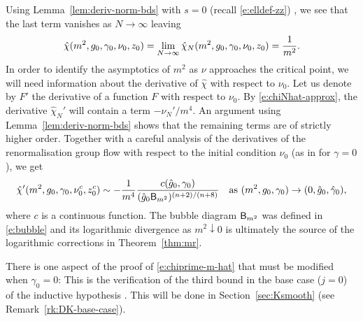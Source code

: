 Using Lemma~\ref{lem:deriv-norm-bds} with $s = 0$ (recall \eqref{e:elldef-zz})
,
we see that the last term vanishes as $N\to\infty$ leaving
\begin{equation}
\label{e:chi-m-hat}
\hat\chi(m^2, g_0, \gamma_0, \nu_0, z_0)
	=
\lim_{N\rightarrow\infty} \hat\chi_N(m^2, g_0, \gamma_0, \nu_0, z_0)
	=
\frac{1}{m^2}.
\end{equation}
In order to identify the asymptotics of $m^2$ as $\nu$ approaches the
critical point, we will need information about the derivative of $\hat\chi$ with
respect to $\nu_0$. Let us denote by $F'$ the derivative of a function $F$ with
respect to $\nu_0$. By \eqref{e:chiNhat-approx}, the derivative $\hat\chi_N'$
will contain a term $-\nu_N'/m^4$. An argument using Lemma~\ref{lem:deriv-norm-bds}
shows that the remaining terms are of strictly higher order. Together with a careful
analysis of the derivatives of the renormalisation group flow with respect to the initial
condition $\nu_0$ (as in \cite[Section~\ref{log-sec:pfmr}]{BBS-saw4-log} for $\gamma = 0$),
we get
\begin{equation}
\label{e:chiprime-m-hat}
\hat\chi'(m^2, g_0, \gamma_0, \nu_0^c, z_0^c)
	\sim
-\frac{1}{m^4} \frac{c(\hat{g}_0, \gamma_0)}{(\hat{g}_0{\sf B}_{m^2})^{(n+2)/(n+8)}}
	\quad
\text{as $(m^2,g_0,\gamma_0) \rightarrow (0,\hat{g}_0,\hat\gamma_0)$},
\end{equation}
where $c$ is a continuous function. The bubble diagram ${\sf B}_{m^2}$ was defined
in \eqref{e:bubble} and its logarithmic divergence as $m^2\downarrow0$ is ultimately
the source of the logarithmic corrections in Theorem~\ref{thm:mr}.

\begin{rk}
There is one aspect of the proof of \eqref{e:chiprime-m-hat} that must be modified when
$\gamma_0 = 0$: This is the verification of the third bound
in the base case ($j = 0$) of the inductive hypothesis \cite[\eqref{log-e:induct1}]{BBS-saw4-log}.
This will be done in Section~\ref{sec:Ksmooth} (see Remark~\ref{rk:DK-base-case}).
\end{rk}

